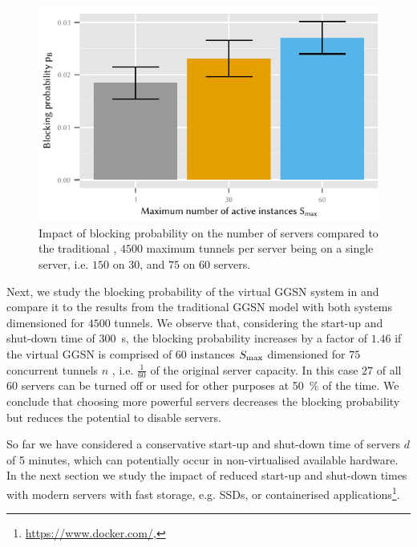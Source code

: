 \begin{figure}
  \centering
  \includegraphics{cloud/virtualized_network_functions/performance_evaluation/figures/blocking_comparison}
  \caption{Impact of blocking probability \blockingprobability on the number of servers compared to the traditional , \(4500\) maximum tunnels per server being on a single server, i.e. \(150\) on \(30\), and \(75\) on \(60\) servers.}
  \label{fig:cloud:virtualized_network_functions:performance_evaluation:virtual_ggsn:blocking_comparison}
\end{figure}

Next, we study the blocking probability of the virtual \gls{GGSN} system in  and compare it to the results from the traditional \gls{GGSN} model with both systems dimensioned for \(4500\) tunnels.
We observe that, considering the start-up and shut-down time of \SI{300}{\second}, the blocking probability \blockingprobability increases by a factor of \(1.46\) if the virtual \gls{GGSN} is comprised of \(60\) instances \(S_{\max}\) dimensioned for \(75\) concurrent tunnels \(n\) , i.e. \(\frac{1}{60}\) of the original server capacity.
In this case \(27\) of all \(60\) servers can be turned off or used for other purposes at \SI{50}{\percent} of the time.
We conclude that choosing more powerful servers decreases the blocking probability but reduces the potential to disable servers.

So far we have considered a conservative start-up and shut-down time of servers \(d\) of 5 minutes, which can potentially occur in non-virtualised available hardware.
In the next section we study the impact of reduced start-up and shut-down times with modern servers with fast storage, e.g. \glspl{SSD}, or containerised applications\footnote{\url{https://www.docker.com/}, \accessed}.

